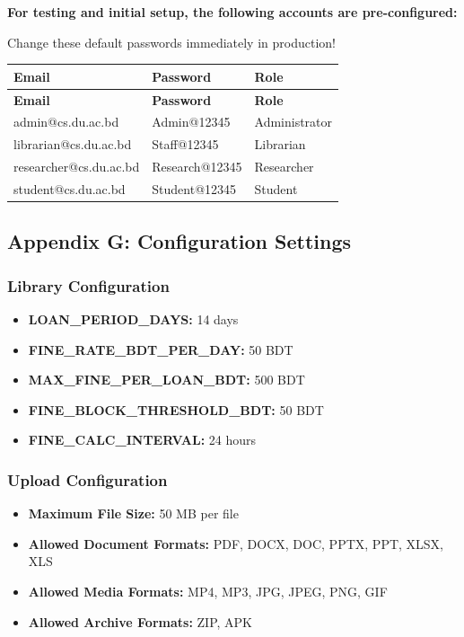 \documentclass[12pt,a4paper]{article}
\begin{document}
\textbf{For testing and initial setup, the following accounts are pre-configured:}

\begin{tcolorbox}[colback=red!5!white,colframe=red,title=Security Warning]
Change these default passwords immediately in production!
\end{tcolorbox}

\begin{longtable}{|l|l|l|}
\hline
\textbf{Email} & \textbf{Password} & \textbf{Role} \\
\hline
\endfirsthead
\hline
\textbf{Email} & \textbf{Password} & \textbf{Role} \\
\hline
\endhead
\hline
\endfoot
admin@cs.du.ac.bd & Admin@12345 & Administrator \\
\hline
librarian@cs.du.ac.bd & Staff@12345 & Librarian \\
\hline
researcher@cs.du.ac.bd & Research@12345 & Researcher \\
\hline
student@cs.du.ac.bd & Student@12345 & Student \\
\hline
\end{longtable}

\subsection{Appendix G: Configuration Settings}

\subsubsection{Library Configuration}
\begin{itemize}[leftmargin=*]
    \item \textbf{LOAN\_PERIOD\_DAYS:} 14 days
    \item \textbf{FINE\_RATE\_BDT\_PER\_DAY:} 50 BDT
    \item \textbf{MAX\_FINE\_PER\_LOAN\_BDT:} 500 BDT
    \item \textbf{FINE\_BLOCK\_THRESHOLD\_BDT:} 50 BDT
    \item \textbf{FINE\_CALC\_INTERVAL:} 24 hours
\end{itemize}

\subsubsection{Upload Configuration}
\begin{itemize}[leftmargin=*]
    \item \textbf{Maximum File Size:} 50 MB per file
    \item \textbf{Allowed Document Formats:} PDF, DOCX, DOC, PPTX, PPT, XLSX, XLS
    \item \textbf{Allowed Media Formats:} MP4, MP3, JPG, JPEG, PNG, GIF
    \item \textbf{Allowed Archive Formats:} ZIP, APK
\end{itemize}
\end{document}
